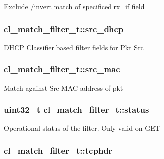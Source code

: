 Exclude /invert match of specificed rx\-\_\-if field \hypertarget{structcl__match__filter__t_a9d90c29a97a7f4c430dfbdf6c40fc9c7}{
\subsubsection[{src\-\_\-dhcp}]{ cl\-\_\-match\-\_\-filter\-\_\-t\-::src\-\_\-dhcp}}\label{structcl__match__filter__t_a9d90c29a97a7f4c430dfbdf6c40fc9c7}
D\-H\-C\-P Classifier based filter fields for Pkt Src \hypertarget{structcl__match__filter__t_ac4b0153044c639dc1e4baea491f30636}{
\subsubsection[{src\-\_\-mac}]{ cl\-\_\-match\-\_\-filter\-\_\-t\-::src\-\_\-mac}}\label{structcl__match__filter__t_ac4b0153044c639dc1e4baea491f30636}
Match against Src M\-A\-C address of pkt \hypertarget{structcl__match__filter__t_ae03c1c223e9dc94b6f91c665f604b1d2}{
\subsubsection[{status}]{\setlength{\rightskip}{0pt plus 5cm}uint32\-\_\-t cl\-\_\-match\-\_\-filter\-\_\-t\-::status}}\label{structcl__match__filter__t_ae03c1c223e9dc94b6f91c665f604b1d2}
Operational status of the filter. Only valid on G\-E\-T \hypertarget{structcl__match__filter__t_a67500b532d5be44ad701432e07d06f6f}{
\subsubsection[{tcphdr}]{ cl\-\_\-match\-\_\-filter\-\_\-t\-::tcphdr}}\label{structcl__match__filter__t_a67500b532d5be44ad701432e07d06f6f}
